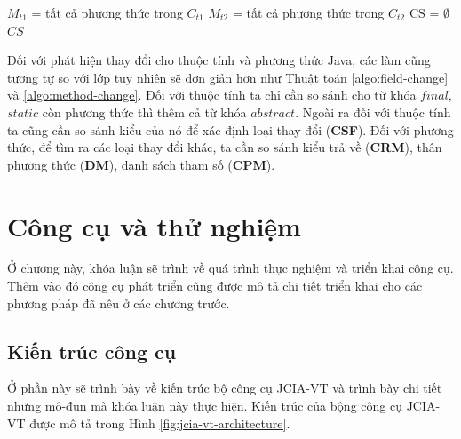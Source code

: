 \documentclass[12pt]{report}
\newenvironment{thuattoan}[1][h]
  {\renewcommand{\algorithmcfname}{Thuật toán}
   \begin{algorithm}[#1]
  }{\end{algorithm}}
\begin{document}
\begin{thuattoan}
	\label{algo:method-change}
	\caption{$MethodChange(C_{t1}, C_{t2})$}
	
	$M_{t1}$ = tất cả phương thức trong $C_{t1}$\;
	$M_{t2}$ = tất cả phương thức trong $C_{t2}$\;
	CS = $\emptyset$\;
	\Return $CS$\;
\end{thuattoan}

Đối với phát hiện thay đổi cho thuộc tính và phương thức Java, các làm cũng tương tự so với lớp tuy nhiên sẽ đơn giản hơn như Thuật toán \ref{algo:field-change} và \ref{algo:method-change}. Đối với thuộc tính ta chỉ cần so sánh cho từ khóa $final$, $static$ còn phương thức thì thêm cả từ khóa $abstract$. Ngoài ra đối với thuộc tính ta cũng cần so sánh kiểu của nó để xác định loại thay đổi (\textbf{CSF}). Đối với phương thức, để tìm ra các loại thay đổi khác, ta cần so sánh kiểu trả về (\textbf{CRM}), thân phương thức (\textbf{DM}), danh sách tham số (\textbf{CPM}).

\chapter{Công cụ và thử nghiệm}
\label{chap:experiment}
Ở chương này, khóa luận sẽ trình về quá trình thực nghiệm và triển khai công cụ. Thêm vào đó công cụ phát triển cũng được mô tả chi tiết triển khai cho các phương pháp đã nêu ở các chương trước.

\section{Kiến trúc công cụ}
Ở phần này sẽ trình bày về kiến trúc bộ công cụ JCIA-VT và trình bày chi tiết những mô-đun mà khóa luận này thực hiện. Kiến trúc của bộng công cụ JCIA-VT được mô tả trong Hình \ref{fig:jcia-vt-architecture}.
\end{document}
